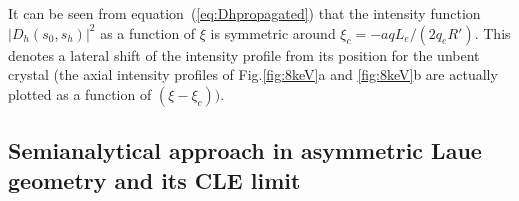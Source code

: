 \documentclass[preprint]{iucr}              %
\newcommand{\todo}[1]{{\color{red}[TODO: "#1'']}}
\newcommand{\inred}[1]{{\color{red}#1}}
\begin{document}
It can be seen from equation~(\ref{eq:Dhpropagated}) that the intensity function $|D_h(s_0,s_h)|^2$ as a function of $\xi$ is symmetric around $\xi_c=-a q L_e / (2 q_e R')$. This denotes a lateral shift of the intensity profile \inred{from its position for the unbent crystal} (the axial intensity profiles of Fig.\ref{fig:8keV}a and \ref{fig:8keV}b are actually \inred{plotted} as a function of $(\xi-\xi_c))$.

\subsection{Semianalytical approach in asymmetric Laue geometry \inred{and its CLE limit}}
\label{sec:LaueCompatibilityCLE}

\end{document}
